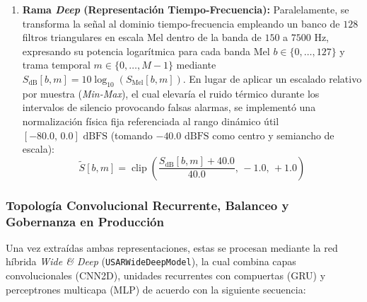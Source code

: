 \documentclass[11pt, a4paper]{article}
\begin{document}
\begin{enumerate}
    \item[2)] \textbf{Rama \textit{Deep} (Representación Tiempo-Frecuencia):} Paralelamente, se transforma la señal al dominio tiempo-frecuencia empleando un banco de $128$ filtros triangulares en escala Mel dentro de la banda de $150$ a $7500\text{ Hz}$, expresando su potencia logarítmica para cada banda Mel $b \in \{0, \dots, 127\}$ y trama temporal $m \in \{0, \dots, M-1\}$ mediante $S_{\text{dB}}[b, m] = 10\log_{10}(S_{\text{Mel}}[b, m])$. En lugar de aplicar un escalado relativo por muestra (\textit{Min-Max}), el cual elevaría el ruido térmico durante los intervalos de silencio provocando falsas alarmas, se implementó una normalización física fija referenciada al rango dinámico útil $[-80.0, \, 0.0]\text{ dBFS}$ (tomando $-40.0\text{ dBFS}$ como centro y semiancho de escala):
    \begin{equation}
        \tilde{S}[b, m] = \operatorname{clip}\left( \frac{S_{\text{dB}}[b, m] + 40.0}{40.0}, \, -1.0, \, +1.0 \right)
    \end{equation}
\end{enumerate}

\subsubsection{Topología Convolucional Recurrente, Balanceo y Gobernanza en Producción}
Una vez extraídas ambas representaciones, estas se procesan mediante la red híbrida \textit{Wide \& Deep} (\texttt{USARWideDeepModel}), la cual combina capas convolucionales (CNN2D), unidades recurrentes con compuertas (GRU) y perceptrones multicapa (MLP) de acuerdo con la siguiente secuencia:
\end{document}
